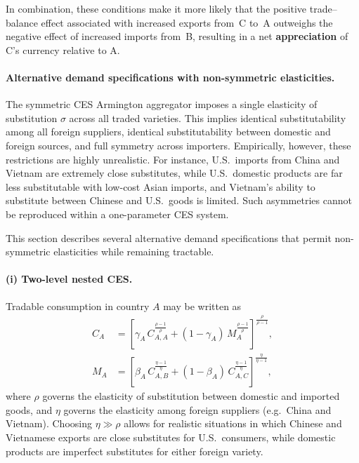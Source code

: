 \documentclass[11pt]{article}
\begin{document}
In combination, these conditions make it more likely that the positive
trade–balance effect associated with increased exports from~C to~A outweighs
the negative effect of increased imports from~B, resulting in a net
\textbf{appreciation} of C's currency relative to A.

\paragraph{Alternative demand specifications with non-symmetric elasticities.}

The symmetric CES Armington aggregator imposes a single elasticity of
substitution $\sigma$ across all traded varieties. This implies identical
substitutability among all foreign suppliers, identical substitutability
between domestic and foreign sources, and full symmetry across importers.
Empirically, however, these restrictions are highly unrealistic. For
instance, U.S.\ imports from China and Vietnam are extremely close
substitutes, while U.S.\ domestic products are far less substitutable
with low-cost Asian imports, and Vietnam's ability to substitute between
Chinese and U.S.\ goods is limited. Such asymmetries cannot be reproduced
within a one-parameter CES system.

This section describes several alternative demand specifications that
permit non-symmetric elasticities while remaining tractable.

\paragraph{(i) Two-level nested CES.}

Tradable consumption in country $A$ may be written as
\begin{align}
C_A
&=
\left[
  \gamma_A \, C_{A,A}^{\frac{\rho-1}{\rho}}
  +
  (1-\gamma_A)
  \, M_A^{\frac{\rho-1}{\rho}}
\right]^{\frac{\rho}{\rho-1}},
\\[0.5em]
M_A
&=
\left[
  \beta_A \, C_{A,B}^{\frac{\eta-1}{\eta}}
  +
  (1-\beta_A) \, C_{A,C}^{\frac{\eta-1}{\eta}}
\right]^{\frac{\eta}{\eta-1}},
\end{align}
where $\rho$ governs the elasticity of substitution between domestic and
imported goods, and $\eta$ governs the elasticity among foreign suppliers
(e.g.\ China and Vietnam). Choosing $\eta \gg \rho$ allows for realistic
situations in which Chinese and Vietnamese exports are close substitutes
for U.S.\ consumers, while domestic products are imperfect substitutes for
either foreign variety.
\end{document}
